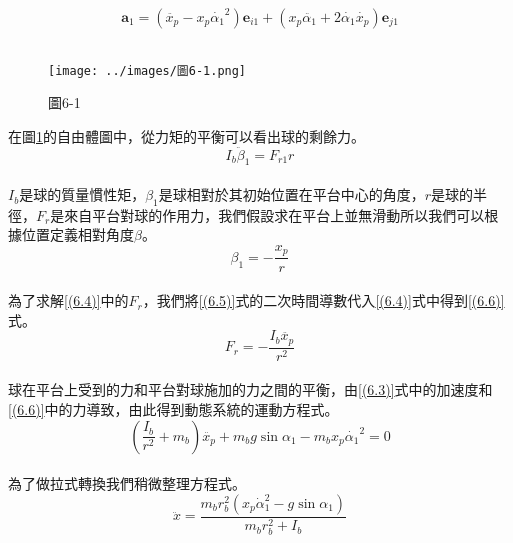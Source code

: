 \begin{equation}
\mathbf{a}_1= \left( \ddot{x_p} - x_p \dot{\alpha_1}^2 \right) \mathbf{e}_{i1} + \left( x_p \ddot{\alpha_1} + 2 \dot{\alpha_1} \dot{x_p} \right) \mathbf{e}_{j1}
\label{(6.3)}
\end{equation}\\

\begin{figure}[h]
\centering
\texttt{[image: ../images/圖6-1.png]}
\caption{圖6-1}
\label{fig:6-1}
\end{figure}

在圖\ref{fig:6-1}的自由體圖中，從力矩的平衡可以看出球的剩餘力。\\

\begin{equation}
I_b \ddot{\beta}_1=F_{r1} r
\label{(6.4)}
\end{equation} \\

\(I_b\)是球的質量慣性矩，\(\beta_1\)是球相對於其初始位置在平台中心的角度，\(r\)是球的半徑，\(F_r\)是來自平台對球的作用力，我們假設求在平台上並無滑動所以我們可以根據位置定義相對角度\(\beta\)。\\

\begin{equation}
\beta_1=-\frac{x_p}{r}
\label{(6.5)}
\end{equation} \\

為了求解\ref{(6.4)}中的\(F_r\)，我們將\ref{(6.5)}式的二次時間導數代入\ref{(6.4)}式中得到\ref{(6.6)}式。\\

\begin{equation}
F_r=-\frac{I_b \ddot{x_p}}{r^2}
\label{(6.6)}
\end{equation} \\

球在平台上受到的力和平台對球施加的力之間的平衡，由\ref{(6.3)}式中的加速度和\ref{(6.6)}中的力導致，由此得到動態系統的運動方程式。\\

\begin{equation}
\left(\frac{I_b}{r^2}+m_b\right) \ddot{x_p}+m_b g \sin \alpha_1-m_b x_p{\dot{\alpha_1}}^2=0
\label{(6.7)}
\end{equation} \\

為了做拉式轉換我們稍微整理方程式。\\

\begin{equation}
\ddot{x}=\frac{m_b r_b^2\left(x_p \dot{\alpha}_1^2-g \sin \alpha_1\right)}{m_b r_b^2+I_b}
\label{(6.8)}
\end{equation} \\

